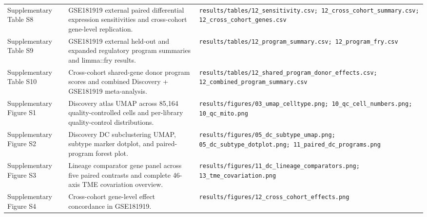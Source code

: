 \documentclass[11pt,a4paper]{article}
\begin{document}
\begin{table}[htbp]
\begin{tabular}{p{3.2cm}p{5.8cm}p{5.8cm}}
Supplementary Table S8 & GSE181919 external paired differential expression sensitivities and cross-cohort gene-level replication. & \texttt{results/tables/12\_sensitivity.csv; 12\_cross\_cohort\_summary.csv; 12\_cross\_cohort\_genes.csv} \\
Supplementary Table S9 & GSE181919 external held-out and expanded regulatory program summaries and limma::fry results. & \texttt{results/tables/12\_program\_summary.csv; 12\_program\_fry.csv} \\
Supplementary Table S10 & Cross-cohort shared-gene donor program scores and combined Discovery + GSE181919 meta-analysis. & \texttt{results/tables/12\_shared\_program\_donor\_effects.csv; 12\_combined\_program\_summary.csv} \\
Supplementary Figure S1 & Discovery atlas UMAP across 85,164 quality-controlled cells and per-library quality-control distributions. & \texttt{results/figures/03\_umap\_celltype.png; 10\_qc\_cell\_numbers.png; 10\_qc\_mito.png} \\
Supplementary Figure S2 & Discovery DC subclustering UMAP, subtype marker dotplot, and paired-program forest plot. & \texttt{results/figures/05\_dc\_subtype\_umap.png; 05\_dc\_subtype\_dotplot.png; 11\_paired\_dc\_programs.png} \\
Supplementary Figure S3 & Lineage comparator gene panel across five paired contrasts and complete 46-axis TME covariation overview. & \texttt{results/figures/11\_dc\_lineage\_comparators.png; 13\_tme\_covariation.png} \\
Supplementary Figure S4 & Cross-cohort gene-level effect concordance in GSE181919. & \texttt{results/figures/12\_cross\_cohort\_effects.png} \\
\bottomrule
\end{tabular}
\end{table}
\end{document}
